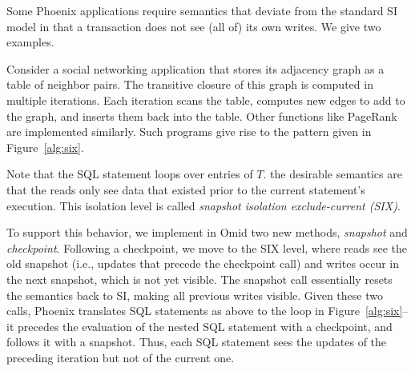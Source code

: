 Some Phoenix applications require semantics that  
deviate from the standard SI model in that a transaction does not see (all of) its own writes.
We give two examples. 

Consider a social networking application that stores its adjacency graph 
as a table of neighbor pairs. The transitive closure of this graph is computed in
multiple iterations. Each iteration scans the table, computes new edges to add to the 
graph, and inserts them back into the table. Other functions like PageRank are implemented
similarly. Such programs give rise to the pattern given in Figure~\ref{alg:six}. 

Note that the SQL statement loops over entries of $T$. 
{}
the desirable semantics are that the reads only see  data that existed prior to the 
current statement's execution. This isolation level is called 
\emph{snapshot isolation exclude-current (SIX)}.

To support this behavior, we implement in Omid two new methods, {\em snapshot\/} and {\em checkpoint}.
Following a checkpoint, we move to the SIX level, where reads see the old snapshot (i.e., updates that
precede the checkpoint call) and writes occur in the next snapshot, which is not yet visible.
The snapshot call essentially resets the semantics back to SI, making all previous writes visible.
Given these two calls, Phoenix translates SQL statements as above to the loop in Figure~\ref{alg:six}-- 
it precedes the evaluation of the nested SQL statement with a checkpoint, and follows it with a snapshot.
Thus, each SQL statement sees the updates of the preceding iteration but not of the current one. 

